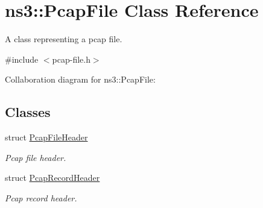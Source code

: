 \hypertarget{classns3_1_1PcapFile}{}\section{ns3\+:\+:Pcap\+File Class Reference}
\label{classns3_1_1PcapFile}


A class representing a pcap file.  




{\ttfamily \#include $<$pcap-\/file.\+h$>$}



Collaboration diagram for ns3\+:\+:Pcap\+File\+:
\subsection*{Classes}
\begin{DoxyCompactItemize}
\item 
struct \hyperlink{structns3_1_1PcapFile_1_1PcapFileHeader}{Pcap\+File\+Header}
\begin{DoxyCompactList}\small\item\em Pcap file header. \end{DoxyCompactList}\item 
struct \hyperlink{structns3_1_1PcapFile_1_1PcapRecordHeader}{Pcap\+Record\+Header}
\begin{DoxyCompactList}\small\item\em Pcap record header. \end{DoxyCompactList}\end{DoxyCompactItemize}
